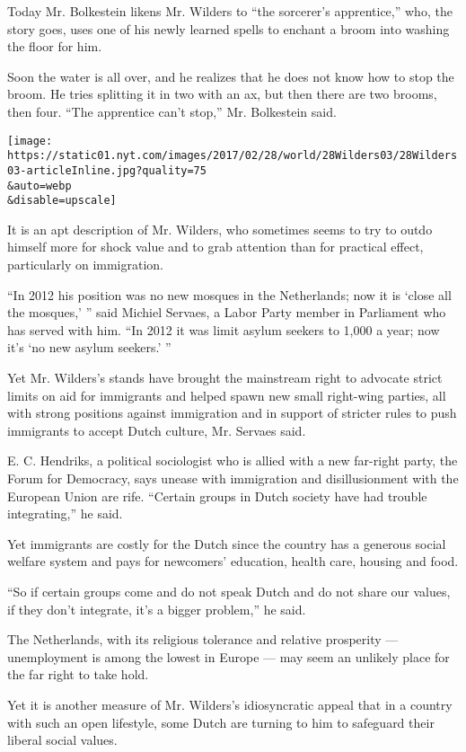 Today Mr. Bolkestein likens Mr. Wilders to ``the sorcerer's
apprentice,'' who, the story goes, uses one of his newly learned spells
to enchant a broom into washing the floor for him.

Soon the water is all over, and he realizes that he does not know how to
stop the broom. He tries splitting it in two with an ax, but then there
are two brooms, then four. ``The apprentice can't stop,'' Mr. Bolkestein
said.

\texttt{[image: https://static01.nyt.com/images/2017/02/28/world/28Wilders03/28Wilders03-articleInline.jpg?quality=75\\\&auto=webp\\\&disable=upscale]}

It is an apt description of Mr. Wilders, who sometimes seems to try to
outdo himself more for shock value and to grab attention than for
practical effect, particularly on immigration.

``In 2012 his position was no new mosques in the Netherlands; now it is
`close all the mosques,' '' said Michiel Servaes, a Labor Party member
in Parliament who has served with him. ``In 2012 it was limit asylum
seekers to 1,000 a year; now it's `no new asylum seekers.' ''

Yet Mr. Wilders's stands have brought the mainstream right to advocate
strict limits on aid for immigrants and helped spawn new small
right-wing parties, all with strong positions against immigration and in
support of stricter rules to push immigrants to accept Dutch culture,
Mr. Servaes said.

E. C. Hendriks, a political sociologist who is allied with a new
far-right party, the Forum for Democracy, says unease with immigration
and disillusionment with the European Union are rife. ``Certain groups
in Dutch society have had trouble integrating,'' he said.

Yet immigrants are costly for the Dutch since the country has a generous
social welfare system and pays for newcomers' education, health care,
housing and food.

``So if certain groups come and do not speak Dutch and do not share our
values, if they don't integrate, it's a bigger problem,'' he said.

The Netherlands, with its religious tolerance and relative prosperity
--- unemployment is among the lowest in Europe --- may seem an unlikely
place for the far right to take hold.

Yet it is another measure of Mr. Wilders's idiosyncratic appeal that in
a country with such an open lifestyle, some Dutch are turning to him to
safeguard their liberal social values.

